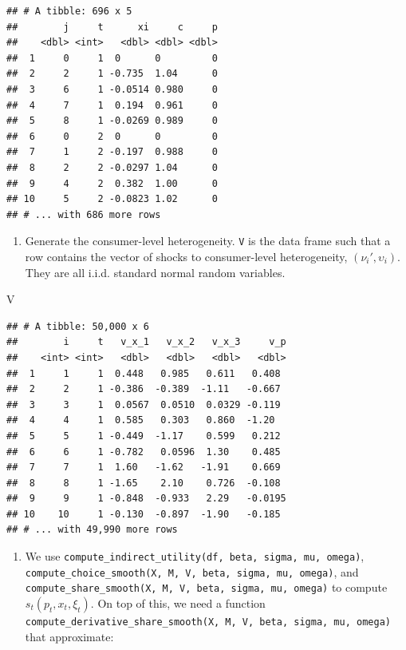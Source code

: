\documentclass[
]{book}
\newenvironment{Shaded}{\begin{snugshade}}{\end{snugshade}}
\newcommand{\NormalTok}[1]{#1}
\providecommand{\tightlist}{%
  \setlength{\itemsep}{0pt}\setlength{\parskip}{0pt}}
\begin{document}
\begin{verbatim}
## # A tibble: 696 x 5
##        j     t      xi     c     p
##    <dbl> <int>   <dbl> <dbl> <dbl>
##  1     0     1  0      0         0
##  2     2     1 -0.735  1.04      0
##  3     6     1 -0.0514 0.980     0
##  4     7     1  0.194  0.961     0
##  5     8     1 -0.0269 0.989     0
##  6     0     2  0      0         0
##  7     1     2 -0.197  0.988     0
##  8     2     2 -0.0297 1.04      0
##  9     4     2  0.382  1.00      0
## 10     5     2 -0.0823 1.02      0
## # ... with 686 more rows
\end{verbatim}

\begin{enumerate}
\def\labelenumi{\arabic{enumi}.}
\setcounter{enumi}{3}
\tightlist
\item
  Generate the consumer-level heterogeneity. \texttt{V} is the data frame such that a row contains the vector of shocks to consumer-level heterogeneity, \((\nu_{i}', \upsilon_i)\). They are all i.i.d. standard normal random variables.
\end{enumerate}

\begin{Shaded}
\begin{Highlighting}[]
\NormalTok{V}
\end{Highlighting}
\end{Shaded}

\begin{verbatim}
## # A tibble: 50,000 x 6
##        i     t   v_x_1   v_x_2   v_x_3     v_p
##    <int> <int>   <dbl>   <dbl>   <dbl>   <dbl>
##  1     1     1  0.448   0.985   0.611   0.408 
##  2     2     1 -0.386  -0.389  -1.11   -0.667 
##  3     3     1  0.0567  0.0510  0.0329 -0.119 
##  4     4     1  0.585   0.303   0.860  -1.20  
##  5     5     1 -0.449  -1.17    0.599   0.212 
##  6     6     1 -0.782   0.0596  1.30    0.485 
##  7     7     1  1.60   -1.62   -1.91    0.669 
##  8     8     1 -1.65    2.10    0.726  -0.108 
##  9     9     1 -0.848  -0.933   2.29   -0.0195
## 10    10     1 -0.130  -0.897  -1.90   -0.185 
## # ... with 49,990 more rows
\end{verbatim}

\begin{enumerate}
\def\labelenumi{\arabic{enumi}.}
\setcounter{enumi}{4}
\tightlist
\item
  We use \texttt{compute\_indirect\_utility(df,\ beta,\ sigma,\ mu,\ omega)}, \texttt{compute\_choice\_smooth(X,\ M,\ V,\ beta,\ sigma,\ mu,\ omega)}, and \texttt{compute\_share\_smooth(X,\ M,\ V,\ beta,\ sigma,\ mu,\ omega)} to compute \(s_t(p_t, x_t, \xi_t)\). On top of this, we need a function \texttt{compute\_derivative\_share\_smooth(X,\ M,\ V,\ beta,\ sigma,\ mu,\ omega)} that approximate:
\end{enumerate}
\end{document}
